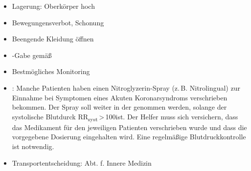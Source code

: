 
\label{m:akutes-koronarsyndrom-beschwerdefrei}
%
\begin{itemize}
    \item Lagerung: Oberkörper hoch
  \item Bewegungensverbot, Schonung
  \item Beengende Kleidung öffnen
    \item {}-Gabe gemäß 
  \item Bestmögliches Monitoring
  \item {}: Manche Patienten haben einen
  Nitroglyzerin-Spray (z.\,B. Nitrolingual{\texttrademark})
  zur Einnahme bei Symptomen eines Akuten Koronarsyndroms
  verschrieben bekommen. Der Spray soll weiter  in der  genommen werden, solange der systolische
  Blutdurck RR\textsubscript{syst}\,{\textgreater}\,100\MmHg*
  ist. Der Helfer muss sich versichern, dass das Medikament
  für den jeweiligen Patienten verschrieben wurde und dass
  die vorgegebene Dosierung eingehalten wird. Eine
  regelmäßige Blutdruckkontrolle ist notwendig.
  \item Transportentscheidung: Abt. f. Innere Medizin
\end{itemize}